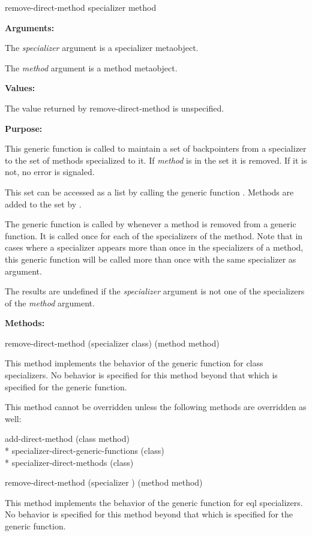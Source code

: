 \begin{defun}
remove-direct-method specializer method

\textbf{Arguments:}

The \emph{specializer} argument is a specializer metaobject.

The \emph{method} argument is a method metaobject.

\textbf{Values:}

The value returned by remove-direct-method is unspecified.

\textbf{Purpose:}

This generic function is called to maintain a set of backpointers from a
specializer to the set of methods specialized to it. If \emph{method} is in the set it
is removed. If it is not, no error is signaled.

This set can be accessed as a list by calling the generic function
. Methods are added to the set by
.

The generic function  is called by 
whenever a method is removed from a generic function. It is called once for each
of the specializers of the method. Note that in cases where a specializer
appears more than once in the specializers of a method, this generic function
will be called more than once with the same specializer as argument.

The results are undefined if the \emph{specializer} argument is not one of the
specializers of the \emph{method} argument.

\textbf{Methods:}

\begin{defun}
remove-direct-method (specializer class) (method method)

This method implements the behavior of the generic function for class
specializers. No behavior is specified for this method beyond that which is
specified for the generic function.

This method cannot be overridden unless the following methods are overridden as
well:

\begin{tabbing}
    add-direct-method (class method)\\*
    specializer-direct-generic-functions (class)\\*
    specializer-direct-methods (class)
\end{tabbing}
\end{defun}

\begin{defun}
remove-direct-method (specializer ) (method method)

This method implements the behavior of the generic function for eql
specializers. No behavior is specified for this method beyond that which is
specified for the generic function.
\end{defun}
\end{defun}

